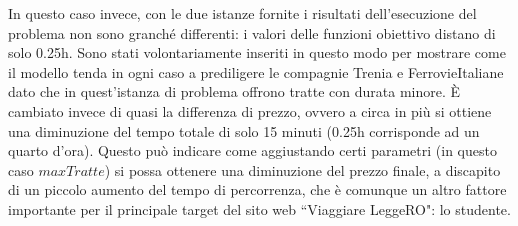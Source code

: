 \documentclass[main.tex]{subfiles}
\begin{document}
In questo caso invece, con le due istanze fornite i risultati dell'esecuzione del problema non sono granché differenti: i valori delle funzioni obiettivo 
distano di solo 0.25h. Sono stati volontariamente inseriti in questo modo per mostrare come il modello tenda in ogni caso a prediligere le compagnie Trenia e 
FerrovieItaliane dato che in quest'istanza di problema offrono tratte con durata minore. È cambiato invece di quasi  la differenza di prezzo, ovvero a 
circa  in più si ottiene una diminuzione del tempo totale di solo 15 minuti (0.25h corrisponde ad un quarto d'ora). Questo può indicare come aggiustando 
certi parametri (in questo caso $maxTratte$) si possa ottenere una diminuzione del prezzo finale, a discapito di un piccolo aumento del tempo di percorrenza, 
che è comunque un altro fattore importante per il principale target del sito web ``Viaggiare LeggeRO": lo studente.
\end{document}

